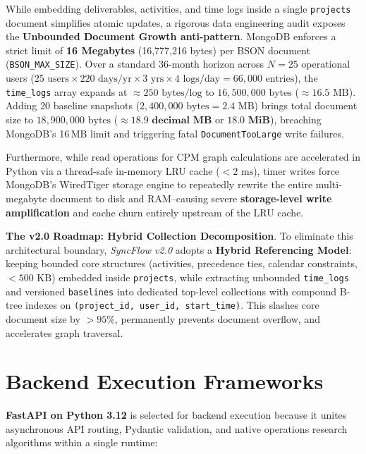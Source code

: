\vspace{3mm}

While embedding deliverables, activities, and time logs inside a single \texttt{projects} document simplifies atomic updates, a rigorous data engineering audit exposes the \textbf{Unbounded Document Growth anti-pattern}. MongoDB enforces a strict limit of \textbf{16 Megabytes} (16,777,216 bytes) per BSON document (\texttt{BSON\_MAX\_SIZE}). Over a standard 36-month horizon across $N = 25$ operational users ($25\text{ users} \times 220\text{ days/yr} \times 3\text{ yrs} \times 4\text{ logs/day} = 66{,}000\text{ entries}$), the \texttt{time\_logs} array expands at $\approx 250\text{ bytes/log}$ to $16{,}500{,}000\text{ bytes}$ ($\approx 16.5\text{ MB}$). Adding 20 baseline snapshots ($2{,}400{,}000\text{ bytes} = 2.4\text{ MB}$) brings total document size to $18{,}900{,}000\text{ bytes}$ ($\approx \mathbf{18.9\text{ decimal MB}}$ or $\mathbf{18.0\text{ MiB}}$), breaching MongoDB's 16\,MB limit and triggering fatal \texttt{DocumentTooLarge} write failures.

\vspace{3mm}

Furthermore, while read operations for CPM graph calculations are accelerated in Python via a thread-safe in-memory LRU cache ($<2\text{ ms}$), timer writes force MongoDB's WiredTiger storage engine to repeatedly rewrite the entire multi-megabyte document to disk and RAM--causing severe \textbf{storage-level write amplification} and cache churn entirely upstream of the LRU cache.

\noindent \textbf{The v2.0 Roadmap: Hybrid Collection Decomposition}. To eliminate this architectural boundary, \textit{SyncFlow v2.0} adopts a \textbf{Hybrid Referencing Model}: keeping bounded core structures (activities, precedence ties, calendar constraints, $<500\text{ KB}$) embedded inside \texttt{projects}, while extracting unbounded \texttt{time\_logs} and versioned \texttt{baselines} into dedicated top-level collections with compound B-tree indexes on \texttt{(project\_id, user\_id, start\_time)}. This slashes core document size by $>95\%$, permanently prevents document overflow, and accelerates graph traversal.

\newpage

\section{Backend Execution Frameworks}
\textbf{FastAPI on Python 3.12} is selected for backend execution because it unites asynchronous API routing, Pydantic validation, and native operations research algorithms within a single runtime:

